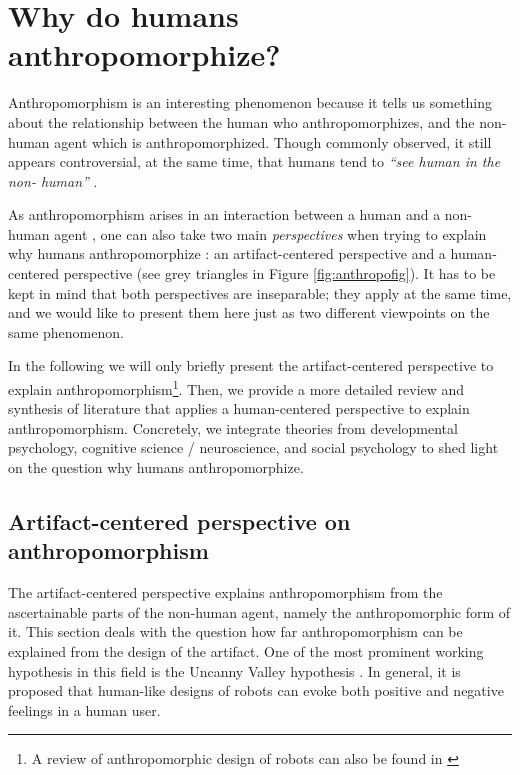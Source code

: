 \documentclass{frontiersSCNS} %
\begin{document}
%
%
%
%
%
%


\section{Why do humans anthropomorphize?}
\label{sec:anthropomorphism}

Anthropomorphism is an interesting phenomenon because it tells us something about 
the relationship between the human who anthropomorphizes, and the non-human agent 
which is anthropomorphized. Though commonly observed, it still appears controversial, at 
the same time, that humans tend to \textit{``see human in the non-
human''} \citep{epley_seeing_2007}.

As anthropomorphism arises in an interaction between a human and a non-human agent
\citep{persson_anthropomorphism_2000}, one can also
take two main \textit{perspectives} when trying to explain why humans anthropomorphize \citep{lee_human_2005}: an artifact-centered perspective and a human-centered perspective (see grey triangles in Figure \ref{fig:anthropofig}). It has to be kept in mind that both perspectives are inseparable; they apply at the 
same time, and we would like to present them here just as two different viewpoints 
on the same phenomenon.

In the following we will only briefly present the artifact-centered perspective to explain anthropomorphism\footnote{A review of anthropomorphic design of robots can also be found in \cite{fink_anthropomorphism_2012}}. Then, we provide a more detailed review and synthesis of literature that applies a human-centered perspective to explain anthropomorphism. Concretely, we integrate theories from developmental psychology, cognitive science / neuroscience, and social psychology to shed light on the question why humans anthropomorphize.


\subsection{Artifact-centered perspective on anthropomorphism}

The artifact-centered perspective explains anthropomorphism from the
ascertainable parts of the non-human agent, namely the anthropomorphic form of
it. This section deals with the question how far anthropomorphism can be
explained from the design of the artifact.  One of the most prominent working
hypothesis in this field is the Uncanny Valley hypothesis
\citep{mori_uncanny_1970}. In general, it is proposed that human-like designs of
robots can evoke both positive and negative feelings in a human user. 
\end{document}

